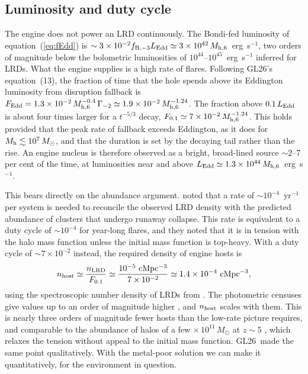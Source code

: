 \documentclass[twocolumn,pdftex]{aastex701}
\newcommand{\msun}{M_{\odot}}
\newcommand{\Mh}{M_{\rm h}}
\newcommand{\mhsix}{M_{\rm h,6}}
\newcommand{\GL}{GL26}
\begin{document}
\subsection{Luminosity and duty cycle}\label{sec:duty}

The engine does not power an LRD continuously. The Bondi-fed luminosity of equation~(\ref{eq:fEdd}) is $\sim3\times10^{-2}f_{\rm B,-3}L_{\rm Edd}\simeq3\times10^{42}\,\mhsix$~erg~s$^{-1}$, two orders of magnitude below the bolometric luminosities of $10^{44}$--$10^{45}$~erg~s$^{-1}$ inferred for LRDs. What the engine supplies is a high rate of flares. Following \GL's equation~(13), the fraction of time that the hole spends above its Eddington luminosity from disruption fallback is $F_{\rm Edd} = 1.3\times10^{-2}\,\mhsix^{-0.4}\,\Gamma_{-2}\simeq1.9\times10^{-2}\,\mhsix^{-1.24}$. The fraction above $0.1\,L_{\rm Edd}$ is about four times larger for a $t^{-5/3}$ decay, $F_{0.1}\simeq7\times10^{-2}\,\mhsix^{-1.24}$. This holds provided that the peak rate of fallback exceeds Eddington, as it does for $\Mh\lesssim10^{7}\,\msun$, and that the duration is set by the decaying tail rather than the rise. An engine nucleus is therefore observed as a bright, broad-lined source $\sim2$--7 per cent of the time, at luminosities near and above $L_{\rm Edd}\simeq1.3\times10^{44}\,\mhsix$~erg~s$^{-1}$.

This bears directly on the abundance argument. \citet{Bellovary:2025a} noted that a rate of $\sim10^{-4}$~yr$^{-1}$ per system is needed to reconcile the observed LRD density with the predicted abundance of clusters that undergo runaway collapse. This rate is equivalent to a duty cycle of $\sim10^{-4}$ for year-long flares, and they noted that it is in tension with the halo mass function unless the initial mass function is top-heavy. With a duty cycle of $\sim7\times10^{-2}$ instead, the required density of engine hosts is
\begin{equation}
n_{\rm host}\simeq\frac{n_{\rm LRD}}{F_{0.1}}\simeq\frac{10^{-5}\ {\rm cMpc^{-3}}}{7\times10^{-2}}\simeq 1.4\times10^{-4}\ {\rm cMpc^{-3}},
\end{equation}
using the spectroscopic number density of LRDs from \citet{Matthee:2024a}. The photometric censuses give values up to an order of magnitude higher \citep{Kokorev:2024a,Akins:2025a}, and $n_{\rm host}$ scales with them. This is nearly three orders of magnitude fewer hosts than the low-rate picture requires, and comparable to the abundance of halos of a few$\,\times10^{11}\,\msun$ at $z\sim5$ \citep{Sheth:1999a}, which relaxes the tension without appeal to the initial mass function. \GL\ made the same point qualitatively. With the metal-poor solution we can make it quantitatively, for the environment in question.
\end{document}

